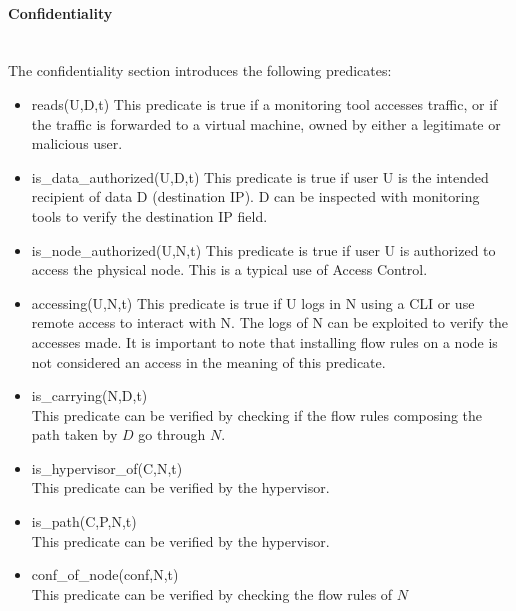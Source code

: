 \paragraph{Confidentiality}\textbf{\\}
The confidentiality section introduces the following predicates:
\begin{itemize}
\item reads(U,D,t)
\newline
This predicate is true if a monitoring tool accesses traffic,  or if the traffic is forwarded to a virtual machine, owned by either a legitimate or malicious user.

\item is\_data\_authorized(U,D,t)
\newline
This predicate is true if user U is the intended recipient of data D (\eg destination IP).
D can be inspected with monitoring tools to verify the destination IP field.
\item is\_node\_authorized(U,N,t)
\newline
This predicate is true if user U is authorized to access the physical node.
This is a typical use of Access Control.
\item accessing(U,N,t)
\newline
This predicate is true if U logs in N using a CLI or use remote access to interact with N.
The logs of N can be exploited to verify the accesses made.
It is important to note that installing flow rules on a node is not considered an access in the meaning of this predicate.

\item is\_carrying(N,D,t)\\
This predicate can be verified by checking if the flow rules composing the path taken by $D$ go through $N$.

\item is\_hypervisor\_of(C,N,t)\\
This predicate  can be verified by the hypervisor.

\item is\_path(C,P,N,t)\\
This predicate  can be verified by the hypervisor.

\item conf\_of\_node(conf,N,t)\\
This predicate  can be verified by checking the flow rules of $N$

\end{itemize}

